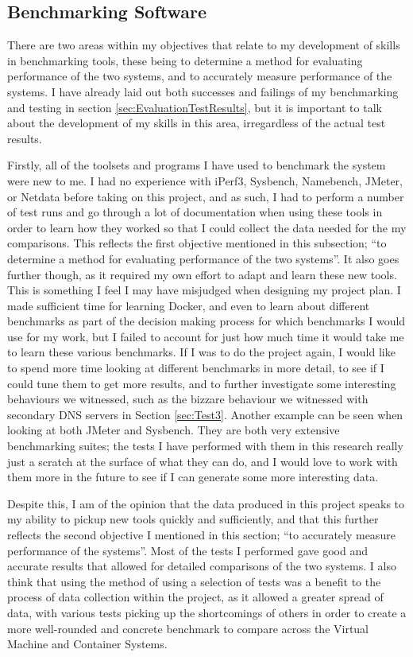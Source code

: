 \subsection{Benchmarking Software}
There are two areas within my objectives that relate to my development of skills in benchmarking tools, these being to determine a method for evaluating performance of the two systems, and to accurately measure performance of the systems. I have already laid out both successes and failings of my benchmarking and testing in section \ref{sec:EvaluationTestResults}, but it is important to talk about the development of my skills in this area, irregardless of the actual test results.

Firstly, all of the toolsets and programs I have used to benchmark the system were new to me. I had no experience with iPerf3, Sysbench, Namebench, JMeter, or Netdata before taking on this project, and as such, I had to perform a number of test runs and go through a lot of documentation when using these tools in order to learn how they worked so that I could collect the data needed for the my comparisons. This reflects the first objective mentioned in this subsection; ``to determine a method for evaluating performance of the two systems''. It also goes further though, as it required my own effort to adapt and learn these new tools. This is something I feel I may have misjudged when designing my project plan. I made sufficient time for learning Docker, and even to learn about different benchmarks as part of the decision making process for which benchmarks I would use for my work, but I failed to account for just how much time it would take me to learn these various benchmarks. If I was to do the project again, I would like to spend more time looking at different benchmarks in more detail, to see if I could tune them to get more results, and to further investigate some interesting behaviours we witnessed, such as the bizzare behaviour we witnessed with secondary DNS servers in Section \ref{sec:Test3}. Another example can be seen when looking at both JMeter and Sysbench. They are both very extensive benchmarking suites; the tests I have performed with them in this research really just a scratch at the surface of what they can do, and I would love to work with them more in the future to see if I can generate some more interesting data.

Despite this, I am of the opinion that the data produced in this project speaks to my ability to pickup new tools quickly and sufficiently, and that this further reflects the second objective I mentioned in this section; ``to accurately measure performance of the systems''. Most of the tests I performed gave good and accurate results that allowed for detailed comparisons of the two systems. I also think that using the method of using a selection of tests was a benefit to the process of data collection within the project, as it allowed a greater spread of data, with various tests picking up the shortcomings of others in order to create a more well-rounded and concrete benchmark to compare across the Virtual Machine and Container Systems.

